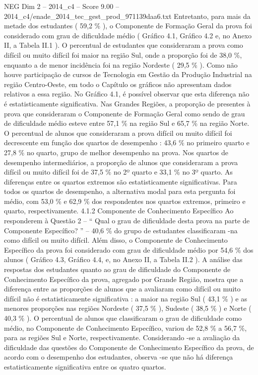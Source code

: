 \begin{textsample}{NEG Dim 2 – 2014\_c4 – Score 9.00 – 2014\_c4/enade\_2014\_tec\_gest\_prod\_971139daa6.txt}
Entretanto, para mais da metade dos estudantes ( 59,2 \% ), o Componente de Formação Geral da prova foi considerado com grau de dificuldade médio ( Gráfico 4.1, Gráfico 4.2 e, no Anexo II, a Tabela II.1 ).
O percentual de estudantes que consideraram a prova como difícil ou muito difícil foi maior na região Sul, onde a proporção foi de 38,0 \%, enquanto a de menor incidência foi na região Nordeste ( 29,5 \% ).
Como não houve participação de cursos de Tecnologia em Gestão da Produção Industrial na região Centro-Oeste, em todo o Capítulo os gráficos não apresentam dados relativos a essa região.
No Gráfico 4.1, é possível observar que esta diferença não é estatisticamente significativa.
Nas Grandes Regiões, a proporção de presentes à prova que consideraram o Componente de Formação Geral como sendo de grau de dificuldade médio esteve entre 57,1 \% na região Sul e 65,7 \% na região Norte.
O percentual de alunos que consideraram a prova difícil ou muito difícil foi decrescente em função dos quartos de desempenho : 43,6 \% no primeiro quarto e 27,8 \% no quarto, grupo de melhor desempenho na prova.
Nos quartos de desempenho intermediários, a proporção de alunos que consideraram a prova difícil ou muito difícil foi de 37,5 \% no 2º quarto e 33,1 \% no 3º quarto.
As diferenças entre os quartos extremos são estatisticamente significativas.
Para todos os quartos de desempenho, a alternativa modal para esta pergunta foi médio, com 53,0 \% e 62,9 \% dos respondentes nos quartos extremos, primeiro e quarto, respectivamente. 4.1.2 Componente de Conhecimento Específico Ao responderem à Questão 2 – “ Qual o grau de dificuldade desta prova na parte de Componente Específico? ” – 40,6 \% do grupo de estudantes classificaram -na como difícil ou muito difícil.
Além disso, o Componente de Conhecimento Específico da prova foi considerado com grau de dificuldade médio por 54,6 \% dos alunos ( Gráfico 4.3, Gráfico 4.4, e, no Anexo II, a Tabela II.2 ).
A análise das respostas dos estudantes quanto ao grau de dificuldade do Componente de Conhecimento Específico da prova, agregado por Grande Região, mostra que a diferença entre as proporções de alunos que a avaliaram como difícil ou muito difícil não é estatisticamente significativa : a maior na região Sul ( 43,1 \% ) e as menores proporções nas regiões Nordeste ( 37,5 \% ), Sudeste ( 38,5 \% ) e Norte ( 40,3 \% ).
O percentual de alunos que classificaram o grau de dificuldade como médio, no Componente de Conhecimento Específico, variou de 52,8 \% a 56,7 \%, para as regiões Sul e Norte, respectivamente.
Considerando -se a avaliação da dificuldade das questões do Componente de Conhecimento Específico da prova, de acordo com o desempenho dos estudantes, observa -se que não há diferença estatisticamente significativa entre os quatro quartos.

\end{textsample}
